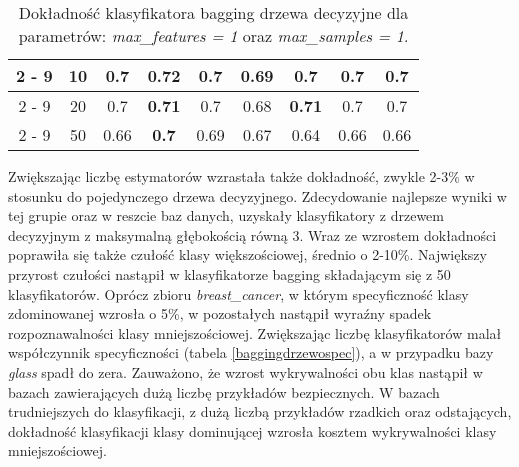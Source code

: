 \begin{table}[H]
\begin{center}
{\begin{tabular}{c|c|ccccccc}
				\cline{2%
					-%
					9}%
				&10&0.7&\textbf{0.72}&0.7&0.69&0.7&0.7&0.7\\%
				\cline{2%
					-%
					9}%
				&20&0.7&\textbf{0.71}&0.7&0.68&\textbf{0.71}&0.7&0.7\\%
				\cline{2%
					-%
					9}%
				&50&0.66&\textbf{0.7}&0.69&0.67&0.64&0.66&0.66\\%
				\hline%
			\end{tabular}}
			\caption{Dokładność klasyfikatora bagging drzewa decyzyjne dla parametrów: \textit{max\_features = 1} oraz \textit{max\_samples = 1}.}
			\label{baggingdrzewoacc}
		\end{center}
	\end{table}
Zwiększając liczbę estymatorów wzrastała także dokładność, zwykle 2-3\% w stosunku do pojedynczego drzewa decyzyjnego. Zdecydowanie najlepsze wyniki w tej grupie oraz w reszcie baz danych, uzyskały klasyfikatory z drzewem decyzyjnym z maksymalną głębokością równą 3. Wraz ze wzrostem dokładności poprawiła się także czułość klasy większościowej, średnio o 2-10\%. Największy przyrost czułości nastąpił w klasyfikatorze bagging składającym się z 50 klasyfikatorów. Oprócz zbioru \textit{breast\_cancer}, w którym specyficzność klasy zdominowanej wzrosła o 5\%, w pozostałych nastąpił wyraźny spadek rozpoznawalności klasy mniejszościowej. Zwiększając liczbę klasyfikatorów malał współczynnik specyficzności (tabela \ref{baggingdrzewospec}), a w przypadku bazy \textit{glass} spadł do zera. Zauważono, że wzrost wykrywalności obu klas nastąpił w bazach zawierających dużą liczbę przykładów bezpiecznych. W bazach trudniejszych do klasyfikacji, z dużą liczbą przykładów rzadkich oraz odstających, dokładność klasyfikacji klasy dominującej wzrosła kosztem wykrywalności klasy mniejszościowej. 
